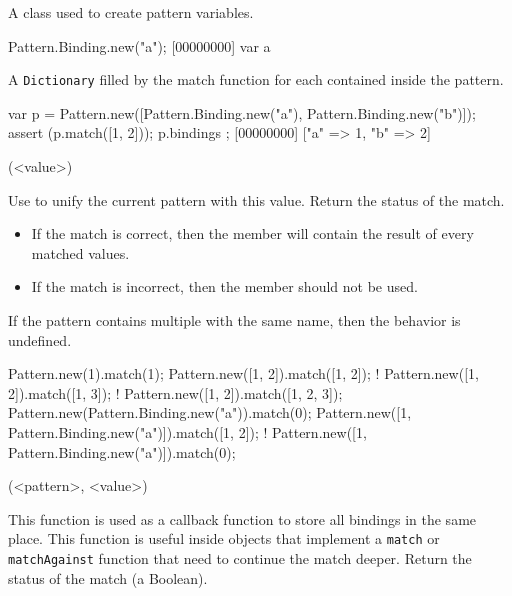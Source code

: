 \begin{urbiscriptapi}
\item[Binding]
  A class used to create pattern variables.

\begin{urbiscript}
Pattern.Binding.new("a");
[00000000] var a
\end{urbiscript}


\item[bindings]

  A \lstinline|Dictionary| filled by the match function for each
   contained inside the pattern.

\begin{urbiscript}
{
  var p = Pattern.new([Pattern.Binding.new("a"), Pattern.Binding.new("b")]);
  assert (p.match([1, 2]));
  p.bindings
};
[00000000] ["a" => 1, "b" => 2]
\end{urbiscript}


\item[match](<value>)%

  Use  to unify the current pattern with this value.
  Return the status of the match.
  \begin{itemize}
    \item If the match is correct, then the  member will
      contain the result of every matched values.
    \item If the match is incorrect, then the  member should
      not be used.
  \end{itemize}
  If the pattern contains multiple  with the same name,
  then the behavior is undefined.

\begin{urbiassert}
Pattern.new(1).match(1);
Pattern.new([1, 2]).match([1, 2]);
! Pattern.new([1, 2]).match([1, 3]);
! Pattern.new([1, 2]).match([1, 2, 3]);
Pattern.new(Pattern.Binding.new("a")).match(0);
Pattern.new([1, Pattern.Binding.new("a")]).match([1, 2]);
! Pattern.new([1, Pattern.Binding.new("a")]).match(0);
\end{urbiassert}


\item[matchPattern](<pattern>, <value>)%

  This function is used as a callback function to store all bindings
  in the same place.  This function is useful inside objects that
  implement a \lstinline|match| or \lstinline|matchAgainst| function
  that need to continue the match deeper.  Return the status of the
  match (a Boolean).


\end{urbiscriptapi}
